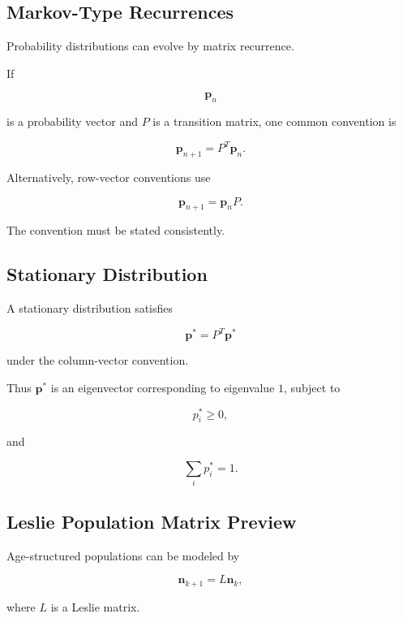 \subsection{Markov-Type Recurrences}
\label{subsec:markov-type-recurrences}

Probability distributions can evolve by matrix recurrence.

If

\[
\mathbf{p}_n
\]

is a probability vector and \(P\) is a transition matrix, one common
convention is

\[
\boxed{
\mathbf{p}_{n+1}
=
P^T\mathbf{p}_n.
}
\]

Alternatively, row-vector conventions use

\[
\boxed{
\mathbf{p}_{n+1}
=
\mathbf{p}_nP.
}
\]

The convention must be stated consistently.

\subsection{Stationary Distribution}
\label{subsec:stationary-distribution-difference}

A stationary distribution satisfies

\[
\boxed{
\mathbf{p}^*
=
P^T\mathbf{p}^*
}
\]

under the column-vector convention.

Thus \(\mathbf{p}^*\) is an eigenvector corresponding to eigenvalue \(1\),
subject to

\[
\boxed{
p_i^*\geq0,
}
\]

and

\[
\boxed{
\sum_i p_i^*=1.
}
\]

\subsection{Leslie Population Matrix Preview}
\label{subsec:leslie-matrix-preview}

Age-structured populations can be modeled by

\[
\boxed{
\mathbf{n}_{k+1}
=
L\mathbf{n}_k,
}
\]

where \(L\) is a Leslie matrix.

